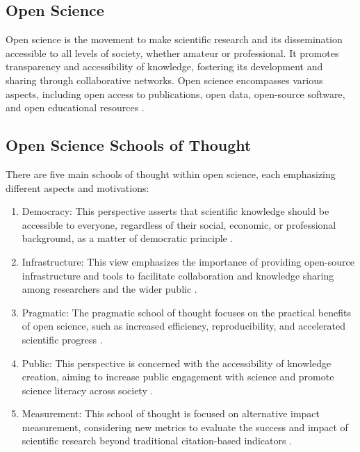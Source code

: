 \documentclass{IEEEtran}
\begin{document}
\subsection{Open Science}
Open science is the movement to make scientific research and its dissemination accessible to all levels of society, whether amateur or professional. It promotes transparency and accessibility of knowledge, fostering its development and sharing through collaborative networks. Open science encompasses various aspects, including open access to publications, open data, open-source software, and open educational resources \cite{nielsen2011reinventing}.

\subsection{Open Science Schools of Thought}
There are five main schools of thought within open science, each emphasizing different aspects and motivations:

\begin{enumerate}
\item Democracy: This perspective asserts that scientific knowledge should be accessible to everyone, regardless of their social, economic, or professional background, as a matter of democratic principle \cite{fecher2014openscience}.

\item Infrastructure: This view emphasizes the importance of providing open-source infrastructure and tools to facilitate collaboration and knowledge sharing among researchers and the wider public \cite{fecher2014openscience}.

\item Pragmatic: The pragmatic school of thought focuses on the practical benefits of open science, such as increased efficiency, reproducibility, and accelerated scientific progress \cite{fecher2014openscience}.

\item Public: This perspective is concerned with the accessibility of knowledge creation, aiming to increase public engagement with science and promote science literacy across society \cite{fecher2014openscience}.

\item Measurement: This school of thought is focused on alternative impact measurement, considering new metrics to evaluate the success and impact of scientific research beyond traditional citation-based indicators \cite{fecher2014openscience}.

\end{enumerate}
\end{document}
